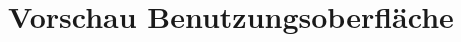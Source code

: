 
\section{Vorschau Benutzungsoberfläche}

\begin{figure}[!htbp]
 	\centering
	\captionsetup{width=15cm} 
\end{figure}
